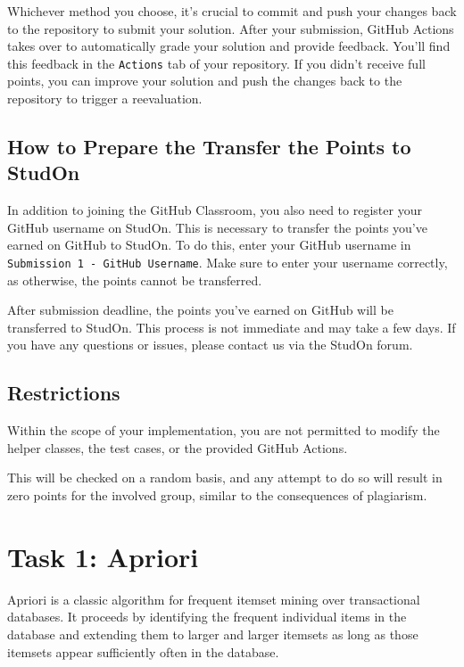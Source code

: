 \documentclass[
english,
smallborders
]{i6prcsht}
\begin{document}
Whichever method you choose, it's crucial to commit and push your changes back to the repository to submit your solution\footnotemark[\value{footnote}]. After your submission, GitHub Actions takes over to automatically grade your solution and provide feedback. You'll find this feedback in the \texttt{Actions} tab of your repository. If you didn't receive full points, you can improve your solution and push the changes back to the repository to trigger a reevaluation.

\subsection*{How to Prepare the Transfer the Points to StudOn}

In addition to joining the GitHub Classroom, you also need to register your GitHub username on StudOn. This is necessary to transfer the points you've earned on GitHub to StudOn. To do this, enter your GitHub username in \texttt{Submission 1 - GitHub Username}. Make sure to enter your username correctly, as otherwise, the points cannot be transferred.

After submission deadline, the points you've earned on GitHub will be transferred to StudOn. This process is not immediate and may take a few days. If you have any questions or issues, please contact us via the StudOn forum.

\subsection*{Restrictions}

Within the scope of your implementation, you are not permitted to modify the helper classes, the test cases, or the provided GitHub Actions.

This will be checked on a random basis, and any attempt to do so will result in zero points for the involved group, similar to the consequences of plagiarism.

\newpage

\section*{Task 1: Apriori}
\label{sec:task-one}

Apriori is a classic algorithm for frequent itemset mining over transactional databases. It proceeds by identifying the frequent individual items in the database and extending them to larger and larger itemsets as long as those itemsets appear sufficiently often in the database.
\end{document}
